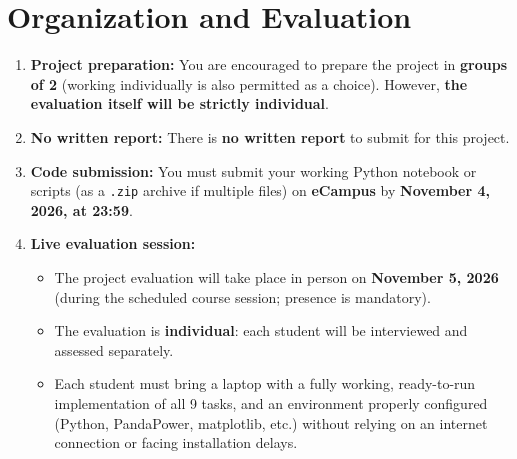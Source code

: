 \documentclass[a4paper]{article}
\begin{document}
\section{Organization and Evaluation} 
\begin{enumerate}
    \item \textbf{Project preparation:} You are encouraged to prepare the project in \textbf{groups of 2} (working individually is also permitted as a choice). However, \textbf{the evaluation itself will be strictly individual}.
    
    \item \textbf{No written report:} There is \textbf{no written report} to submit for this project.
    
    \item \textbf{Code submission:} You must submit your working Python notebook or scripts (as a \texttt{.zip} archive if multiple files) on \textbf{eCampus} by \textbf{November 4, 2026, at 23:59}.
    
    \item \textbf{Live evaluation session:} 
    \begin{itemize}
        \item The project evaluation will take place in person on \textbf{November 5, 2026} (during the scheduled course session; presence is mandatory).
        \item The evaluation is \textbf{individual}: each student will be interviewed and assessed separately.
        \item Each student must bring a laptop with a fully working, ready-to-run implementation of all 9 tasks, and an environment properly configured (Python, PandaPower, matplotlib, etc.) without relying on an internet connection or facing installation delays.
    \end{itemize}
    

\end{enumerate}
\end{document}

